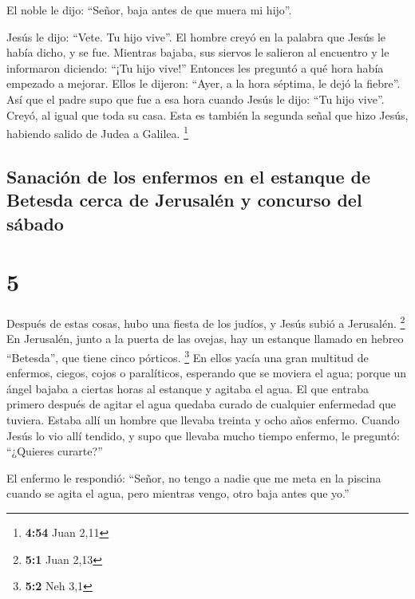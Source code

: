  El noble le dijo: ``Señor, baja antes de que muera mi
hijo''.

 Jesús le dijo: ``Vete. Tu hijo vive''. El hombre creyó
en la palabra que Jesús le había dicho, y se fue. 
Mientras bajaba, sus siervos le salieron al encuentro y le informaron
diciendo: ``¡Tu hijo vive!''  Entonces les preguntó a qué
hora había empezado a mejorar. Ellos le dijeron: ``Ayer, a la hora
séptima, le dejó la fiebre''.  Así que el padre supo que
fue a esa hora cuando Jesús le dijo: ``Tu hijo vive''. Creyó, al igual
que toda su casa.  Esta es también la segunda señal que
hizo Jesús, habiendo salido de Judea a Galilea. \footnote{\textbf{4:54}
  Juan 2,11}

\hypertarget{sanaciuxf3n-de-los-enfermos-en-el-estanque-de-betesda-cerca-de-jerusaluxe9n-y-concurso-del-suxe1bado}{%
\subsection{Sanación de los enfermos en el estanque de Betesda cerca de
Jerusalén y concurso del
sábado}\label{sanaciuxf3n-de-los-enfermos-en-el-estanque-de-betesda-cerca-de-jerusaluxe9n-y-concurso-del-suxe1bado}}

\hypertarget{section-4}{%
\section{5}\label{section-4}}

 Después de estas cosas, hubo una fiesta de los judíos, y
Jesús subió a Jerusalén. \footnote{\textbf{5:1} Juan 2,13}
 En Jerusalén, junto a la puerta de las ovejas, hay un
estanque llamado en hebreo ``Betesda'', que tiene cinco pórticos.
\footnote{\textbf{5:2} Neh 3,1}  En ellos yacía una gran
multitud de enfermos, ciegos, cojos o paralíticos, esperando que se
moviera el agua;  porque un ángel bajaba a ciertas horas
al estanque y agitaba el agua. El que entraba primero después de agitar
el agua quedaba curado de cualquier enfermedad que tuviera.
 Estaba allí un hombre que llevaba treinta y ocho años
enfermo.  Cuando Jesús lo vio allí tendido, y supo que
llevaba mucho tiempo enfermo, le preguntó: ``¿Quieres curarte?''

 El enfermo le respondió: ``Señor, no tengo a nadie que me
meta en la piscina cuando se agita el agua, pero mientras vengo, otro
baja antes que yo.''

